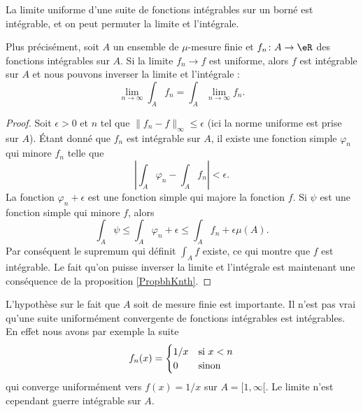 \begin{theorem}			\label{ThoUnifCvIntRiem}
    La limite uniforme d'une suite de fonctions intégrables sur un borné est intégrable, et on peut permuter la limite et l'intégrale. 
    
    Plus précisément, soit \( A\) un ensemble de \( \mu\)-mesure finie et \( f_n\colon A\to \eR\) des fonctions intégrables sur \( A\). Si la limite \( f_n\to f\) est uniforme, alors \( f\) est intégrable sur \( A\) et nous pouvons inverser la limite et l'intégrale :
    \begin{equation}
        \lim_{n\to \infty} \int_A f_n=\int_A\lim_{n\to \infty} f_n.
    \end{equation}
\end{theorem}

\begin{proof}
    Soit \( \epsilon>0\) et \( n\) tel que \( \| f_n-f \|_{\infty}\leq \epsilon\) (ici la norme uniforme est prise sur \( A\)). Étant donné que \( f_n\) est intégrable sur \( A\), il existe une fonction simple \( \varphi_n\) qui minore \( f_n\) telle que
    \begin{equation}
        \left| \int_{A}\varphi_n-\int_A f_n \right| <\epsilon.
    \end{equation}
    La fonction \( \varphi_n+\epsilon\) est une fonction simple qui majore la fonction \( f\). Si \( \psi\) est une fonction simple qui minore \( f\), alors
    \begin{equation}
        \int_A\psi\leq\int_A\varphi_n+\epsilon\leq\int_A f_n+\epsilon\mu(A).
    \end{equation}
    Par conséquent le supremum qui définit \( \int_A f\) existe, ce qui montre que \( f\) est intégrable. Le fait qu'on puisse inverser la limite et l'intégrale est maintenant une conséquence de la proposition \ref{PropbhKnth}.
\end{proof}

\begin{remark}
    L'hypothèse sur le fait que \( A\) soit de mesure finie est importante. Il n'est pas vrai qu'une suite uniformément convergente de fonctions intégrables est intégrables. En effet nous avons par exemple la suite
    \begin{equation}
        f_n(x)=\begin{cases}
            1/x    &   \text{si \( x<n\)}\\
            0    &    \text{sinon}
        \end{cases}
    \end{equation}
    qui converge uniformément vers \( f(x)=1/x\) sur \( A=\mathopen[ 1 , \infty [\). Le limite n'est cependant guerre intégrable sur \( A\).
\end{remark}

